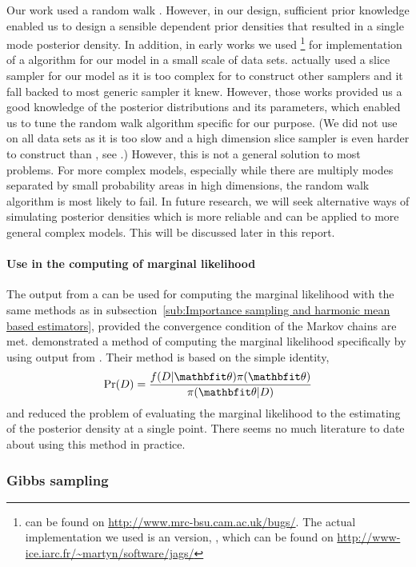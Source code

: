 Our work used a random walk \mha. However, in our design, sufficient prior
knowledge enabled us to design a sensible dependent prior densities that
resulted in a single mode posterior density. In addition, in early works we
used \bugs\footnote{\bugs can be found on
  \url{http://www.mrc-bsu.cam.ac.uk/bugs/}. The actual implementation we used
  is an \unix version, \jags, which can be found on
  \url{http://www-ice.iarc.fr/~martyn/software/jags/}} for implementation of a
\mcmc algorithm for our model in a small scale of data sets.  \bugs actually
used a slice sampler for our model as it is too complex for \bugs to construct
other samplers and it fall backed to most generic sampler it knew. However,
those works provided us a good knowledge of the posterior distributions and
its parameters, which enabled us to tune the random walk algorithm specific
for our purpose. (We did not use \bugs on all data sets as it is too slow and
a high dimension slice sampler is even harder to construct than \mha, see
\textcite{Roberts2002}.) However, this is not a general solution to most
problems. For more complex models, especially while there are multiply modes
separated by small probability areas in high dimensions, the random walk
algorithm is most likely to fail. In future research, we will seek alternative
ways of simulating posterior densities which is more reliable and can be
applied to more general complex models. This will be discussed later in this
report.

\paragraph{Use in the computing of marginal likelihood} The output from a \mha
can be used for computing the marginal likelihood with the same methods as in
subsection~\ref{sub:Importance sampling and harmonic mean based estimators},
provided the convergence condition of the Markov chains are met.
\textcite{Chib2001} demonstrated a method of computing the marginal likelihood
specifically by using output from \mha. Their method is based on the simple
identity,
\begin{equation}
  \Pr(D) = \frac{f(D|\bth)\pi(\bth)}{\pi(\bth|D)}
\end{equation}
and reduced the problem of evaluating the marginal likelihood to the
estimating of the posterior density at a single point. There seems no much
literature to date about using this method in practice.

\subsubsection{Gibbs sampling}
\label{ssub:Gibbs sampling}

